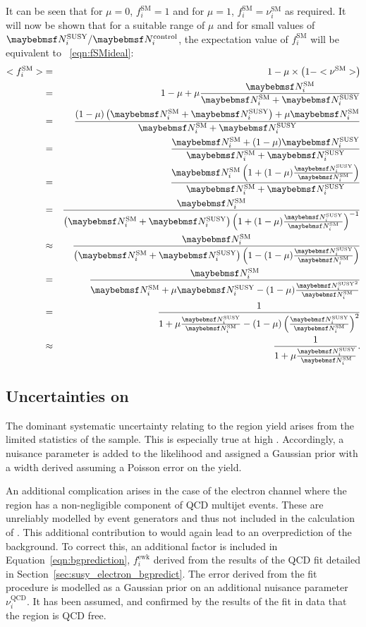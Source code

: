 It can be seen that for $\mu=0$, $f^{\textrm{SM}}_i=1$ and for $\mu=1$,
$f^{\textrm{SM}}_i=\nu^{\textrm{SM}}_i$ as required. It will now be shown that
for a suitable range of $\mu$ and for small values of $\NSUSYi/\NControli$, the
expectation value of $f^{\textrm{SM}}_i$ will be equivalent to
\eqn~\ref{eqn:fSMideal}:
\begin{eqnarray*}
<f^{\textrm{SM}}_i> &=& 1 - \mu \times \left(1-<\nu^{\textrm{SM}}>\right) \\
                  &=& 1 - \mu  + \mu\frac{\NSMi}{\NSMi + \NSUSYi} \\
                  &=& \frac{(1-\mu)\left(\NSMi + \NSUSYi\right) + \mu\NSMi}{\NSMi + \NSUSYi} \\
                  &=& \frac{\NSMi + (1 - \mu)\NSUSYi}{\NSMi + \NSUSYi} \\
                  &=& \frac{\NSMi \left( 1 + (1-\mu)\frac{\NSUSYi}{\NSMi}\right)}{\NSMi + \NSUSYi} \\
                  &=& \frac{\NSMi}{\left(\NSMi +\NSUSYi\right)\left( 1 + (1 - \mu)\frac{\NSUSYi}{\NSMi}\right)^{-1}} \\
                  &\approx& \frac{\NSMi}{\left(\NSMi +\NSUSYi\right)\left( 1 - (1-\mu)\frac{\NSUSYi}{\NSMi}\right)} \\
                  &=& \frac{\NSMi}{\NSMi + \mu\NSUSYi - (1-\mu)\frac{\NSUSYi^2}{\NSMi}}\\
                  &=& \frac{1}{1 + \mu\frac{\NSUSYi}{\NSMi} - (1-\mu)\left(\frac{\NSUSYi}{\NSMi}\right)^2} \\
                  &\approx& \frac{1}{1 + \mu\frac{\NSUSYi}{\NSMi}}.
\end{eqnarray*}

\subsection{Uncertainties on \texorpdfstring{\NControli}{NControli}}
The dominant systematic uncertainty relating to the \LPcontrol region yield
arises from the limited statistics of the sample. This is especially true at
high \STlep. Accordingly, a nuisance parameter is added to the likelihood and
assigned a Gaussian prior with a width derived assuming a Poisson error on the
\NControli yield.

An additional complication arises in the case of the electron channel where the
\LPcontrol region has a non-negligible component of \ac{QCD} multijet
events. These are unreliably modelled by event generators and thus not included
in the calculation of \RCSi. This additional contribution to \NControli would
again lead to an overprediction of the background. To correct this, an
additional factor is included in Equation~\ref{eqn:bgprediction},
$f^{\textrm{ewk}}_i$ derived from the results of the \ac{QCD} fit detailed in
Section~\ref{sec:susy_electron_bgpredict}. The error derived from the fit
procedure is modelled as a Gaussian prior on an additional nuisance parameter
$\nu^{\textrm{QCD}}_i$. It has been assumed, and confirmed by the results of the
fit in data that the region \LPsignal is \ac{QCD} free.

